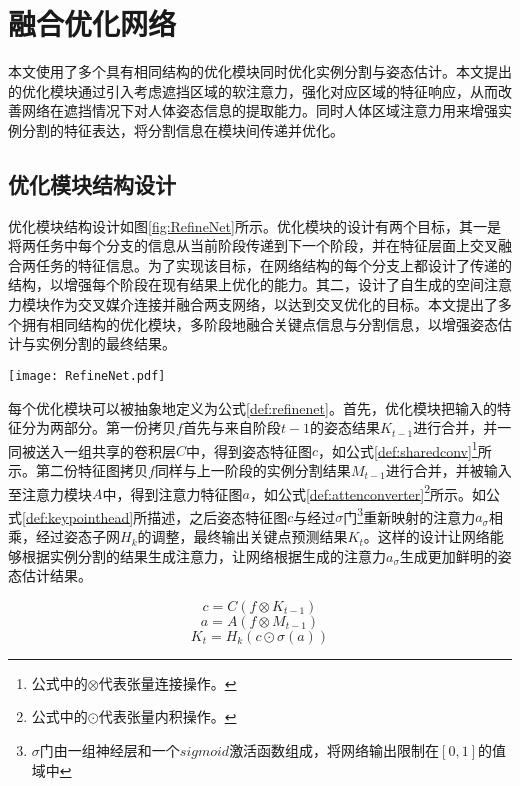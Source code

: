 \section{融合优化网络}
\label{sec:refine}
本文使用了多个具有相同结构的优化模块同时优化实例分割与姿态估计。本文提出的优化模块通过引入考虑遮挡区域的软注意力，强化对应区域的特征响应，从而改善网络在遮挡情况下对人体姿态信息的提取能力。同时人体区域注意力用来增强实例分割的特征表达，将分割信息在模块间传递并优化。

\subsection{优化模块结构设计}
\label{subsec:architecture}

优化模块结构设计如图\ref{fig:RefineNet}所示。优化模块的设计有两个目标，其一是将两任务中每个分支的信息从当前阶段传递到下一个阶段，并在特征层面上交叉融合两任务的特征信息。为了实现该目标，在网络结构的每个分支上都设计了传递的结构，以增强每个阶段在现有结果上优化的能力。其二，设计了自生成的空间注意力模块作为交叉媒介连接并融合两支网络，以达到交叉优化的目标。本文提出了多个拥有相同结构的优化模块，多阶段地融合关键点信息与分割信息，以增强姿态估计与实例分割的最终结果。

\begin{figure*}[h]	
	\centering
	\texttt{[image: RefineNet.pdf]}
	\caption{融合优化网络具体设计}
	\label{fig:RefineNet}
\end{figure*}

每个优化模块可以被抽象地定义为公式\eqref{def:refinenet}。首先，优化模块把输入的特征分为两部分。第一份拷贝$f$首先与来自阶段$t-1$的姿态结果$K_{t-1}$进行合并，并一同被送入一组共享的卷积层$C$中，得到姿态特征图$c$，如公式\eqref{def:sharedconv}\footnote{公式中的$\otimes$代表张量连接操作。}所示。第二份特征图拷贝$f$同样与上一阶段的实例分割结果$M_{t-1}$进行合并，并被输入至注意力模块$A$中，得到注意力特征图$a$，如公式\eqref{def:attenconverter}\footnote{公式中的$\odot$代表张量内积操作。}所示。如公式\eqref{def:keypointhead}所描述，之后姿态特征图$c$与经过$\sigma$门\footnote{$\sigma$门由一组神经层和一个$sigmoid$激活函数组成，将网络输出限制在$[0,1]$的值域中}重新映射的注意力$a_{\sigma}$相乘，经过姿态子网$H_k$的调整，最终输出关键点预测结果$K_t$。这样的设计让网络能够根据实例分割的结果生成注意力，让网络根据生成的注意力$a_{\sigma}$生成更加鲜明的姿态估计结果。

\begin{equation}
\label{def:sharedconv}
c = C(f\otimes{K_{t-1}})
\end{equation}
\begin{equation}
\label{def:attenconverter}
a = A(f\otimes{M_{t-1}})
\end{equation}
\begin{equation}
\label{def:keypointhead}
K_t = H_k(c\odot \sigma(a))
\end{equation}

